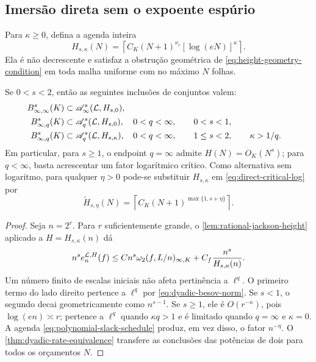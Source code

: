 \subsection{Imersão direta sem o expoente espúrio}

Para $\kappa\ge0$, defina a agenda inteira
\begin{equation}
 H_{s,\kappa}(N)
 =\left\lceil C_K(N+1)^{\nu_s}
        [\log(eN)]^\kappa\right\rceil.
 \label{eq:corrected-height-schedule}
\end{equation}
Ela é não decrescente e satisfaz a obstrução geométrica de
\eqref{eq:height-geometry-condition} em toda malha uniforme com no máximo
$N$ folhas.

\begin{theorem}
\label{thm:direct-besov-height}
Se $0<s<2$, então as seguintes inclusões de conjuntos valem:
\begin{align}
 B^s_{\infty,\infty}(K)
 &\subset
 \mathscr A^s_\infty(\mathcal{L},H_{s,0}),
 \label{eq:direct-endpoint}\\
 B^s_{\infty,q}(K)
 &\subset
 \mathscr A^s_q(\mathcal{L},H_{s,0}),
 &&0<q<\infty,\qquad 0<s<1,
 \label{eq:direct-subcritical}\\
 B^s_{\infty,q}(K)
 &\subset
 \mathscr A^s_q(\mathcal{L},H_{s,\kappa}),
 &&0<q<\infty,\qquad 1\le s<2,\qquad\kappa>1/q.
 \label{eq:direct-critical-log}
\end{align}
Em particular, para $s\ge1$, o endpoint $q=\infty$ admite
$H(N)=O_K(N^s)$; para $q<\infty$, basta acrescentar um fator logarítmico
crítico. Como
alternativa sem logaritmo, para qualquer $\eta>0$ pode-se substituir
$H_{s,\kappa}$ em \eqref{eq:direct-critical-log} por
\begin{equation}
 \widetilde H_{s,\eta}(N)
 =\left\lceil C_K(N+1)^{\max\{1,s+\eta\}}\right\rceil.
 \label{eq:polynomial-slack-schedule}
\end{equation}
\end{theorem}

\begin{proof}
Seja $n=2^r$. Para $r$ suficientemente grande, o
\cref{lem:rational-jackson-height} aplicado a
$H=H_{s,\kappa}(n)$ dá
\begin{equation}
 n^s e_n^{\mathcal{L},H}(f)
 \le C n^s\omega_2(f,L/n)_{\infty,K}
     +C_f\frac{n^s}{H_{s,\kappa}(n)}.
 \label{eq:direct-sequence-bound}
\end{equation}
Um número finito de escalas iniciais não afeta pertinência a $\ell^q$. O
primeiro termo do lado direito pertence a $\ell^q$ por
\eqref{eq:dyadic-besov-norm}. Se $s<1$, o segundo decai geometricamente como
$n^{s-1}$. Se $s\ge1$, ele é $O(r^{-\kappa})$, pois
$\log(en)\asymp r$; pertence a $\ell^q$ quando $\kappa q>1$ e é limitado
quando $q=\infty$ e $\kappa=0$. A agenda
\eqref{eq:polynomial-slack-schedule} produz, em vez disso, o fator
$n^{-\eta}$. O \cref{thm:dyadic-rate-equivalence} transfere as conclusões
das potências de dois para todos os orçamentos $N$.
\end{proof}

